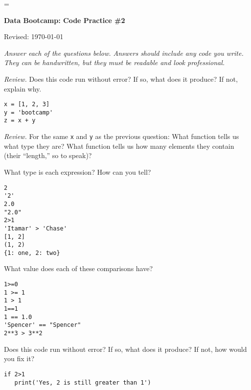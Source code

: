 \documentclass[11pt]{exam}
\begin{document}
\parskip=\bigskipamount
\parindent=0.0in
\thispagestyle{empty}


\bigskip\bigskip
\centerline{\Large \bf Data Bootcamp:  Code Practice \#2}
\centerline{Revised: \today}

{\it Answer each of the questions below.
Answers should include any code you write.
They can be handwritten, but they must be readable and look professional.}

\begin{questions}

\item {\it Review.\/} Does this code run without error? If so, what does it produce?  If not, explain why.
\begin{verbatim}
x = [1, 2, 3]
y = 'bootcamp'
z = x + y
\end{verbatim}

\item {\it Review.\/} For the same {\tt x} and {\tt y} as the previous question:
What function tells us what type they are?
What function tells us how many elements they contain
(their ``length,'' so to speak)?



\item What type is each expression?  How can you tell?
\begin{verbatim}
2
'2'
2.0
"2.0"
2>1
'Itamar' > 'Chase'
[1, 2]
(1, 2)
{1: one, 2: two}
\end{verbatim}

\item What value does each of these comparisons have?
\begin{verbatim}
1>=0
1 >= 1
1 > 1
1==1
1 == 1.0
'Spencer' == "Spencer"
2**3 > 3**2 
\end{verbatim}

\item  Does this code run without error?  If so, what does it produce?  If not, how would you fix it?
\begin{verbatim}
if 2>1
   print('Yes, 2 is still greater than 1')
\end{verbatim}


\end{questions}
\end{document}
